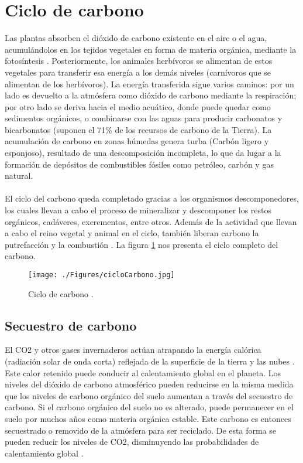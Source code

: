 \section{Ciclo de carbono} 
Las plantas absorben el dióxido de carbono existente en el aire o el agua, acumul\'andolos en los tejidos vegetales en forma de materia org\'anica, mediante la fotos\'intesis \cite{natur2015PW}. Posteriormente, los animales herb\'ivoros se alimentan de estos vegetales para transferir esa energ\'ia a los dem\'as niveles (carnívoros que se alimentan de los herb\'ivoros).
La energía transferida sigue varios caminos: por un lado es devuelto a la atm\'osfera como di\'oxido de carbono mediante la respiraci\'on; por otro lado se deriva hacia el medio acu\'atico, donde puede quedar como sedimentos org\'anicos, o combinarse con las aguas para producir carbonatos y bicarbonatos (suponen el 71\% de los recursos de carbono de la Tierra). La acumulaci\'on de carbono en zonas h\'umedas genera turba (Carb\'on ligero y esponjoso), resultado de una descomposición incompleta, lo que da lugar a la formaci\'on de dep\'ositos de combustibles f\'osiles como petr\'oleo, carb\'on y gas natural.\\~\\
El ciclo del carbono queda completado gracias a los organismos des\-componedores, los cuales llevan a cabo el proceso de mineralizar y descomponer los restos org\'anicos, cad\'averes, excrementos, entre otros. Adem\'as de la actividad que llevan a cabo el reino vegetal y animal en el ciclo, tambi\'en liberan carbono la putrefacci\'on y la combusti\'on \cite{natur2015PW}. La figura \ref{fig:ciclocarbono} nos presenta el ciclo completo del carbono.
    \begin{figure}[!hbtp]
    	\centering
    	\texttt{[image: ./Figures/cicloCarbono.jpg]}
    	\caption{Ciclo de carbono \cite{ciclot2015carbo}.}
    	\label{fig:ciclocarbono}
    \end{figure}


\subsection{Secuestro de carbono}
El CO2 y otros gases invernaderos actúan atrapando la energ\'ia cal\'orica (radiación solar de onda corta) reflejada de la superficie de la tierra y las nubes \cite{encaptura}. Este calor retenido puede conducir al calentamiento global en el planeta. Los niveles del di\'oxido de carbono atmosf\'erico pueden reducirse en la misma medida que los niveles de carbono org\'anico del suelo aumentan a trav\'es del secuestro de carbono. Si el carbono org\'anico del suelo no es alterado, puede permanecer en el suelo por muchos a\~{n}os como materia org\'anica estable. Este carbono es entonces secuestrado o removido de la atm\'osfera para ser reciclado. De esta forma se pueden reducir los niveles de CO2, disminuyendo las probabilidades de calentamiento global \cite{castillo2003manejo}.

